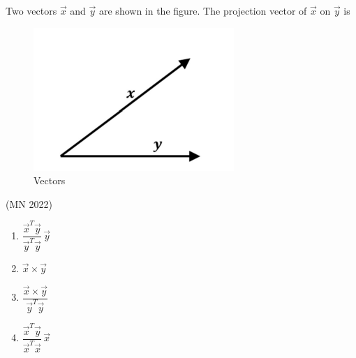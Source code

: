 \item Two vectors $\vec{x}$ and $\vec{y}$ are shown in the figure. The projection vector of $\vec{x}$ on $\vec{y}$ is
 \begin{figure}[H]
  \centering
  \includegraphics[width=0.4\columnwidth]{GATE/2022/MN/figs/vec.png}
  \caption{Vectors}
  \label{fig:vec}
\end{figure}
\hfill (MN 2022)
\begin{multicols}{4}
\begin{enumerate}
\item $\dfrac{\vec{x}^T \vec{y}}{\vec{y}^T \vec{y}} \, \vec{y}$
\item $\vec{x} \times \vec{y}$
\item $\dfrac{\vec{x} \times \vec{y}}{\vec{y}^T \vec{y}}$
\item $\dfrac{\vec{x}^T \vec{y}}{\vec{x}^T \vec{x}} \, \vec{x}$
\end{enumerate}
\end{multicols}


